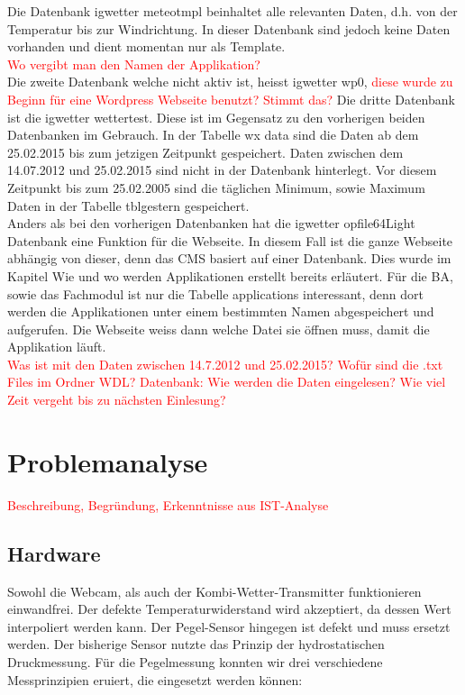 \documentclass[a4paper,ngerman, 11pt]{report}
\newcommand\Diskussionspunkt[1]{\textcolor{red}{#1}}
\begin{document}
Die Datenbank igwetter meteotmpl beinhaltet alle relevanten Daten, d.h. von der Temperatur bis zur Windrichtung. In dieser Datenbank sind jedoch keine Daten vorhanden und dient momentan nur als Template.\\

\Diskussionspunkt{Wo vergibt man den Namen der Applikation?}\\
Die zweite Datenbank welche nicht aktiv ist, heisst igwetter wp0, \Diskussionspunkt{diese wurde zu Beginn für eine Wordpress Webseite benutzt? Stimmt das?} Die dritte Datenbank ist die igwetter wettertest. Diese ist im Gegensatz zu den vorherigen beiden Datenbanken im Gebrauch. In der Tabelle wx data sind die Daten ab dem 25.02.2015 bis zum jetzigen Zeitpunkt gespeichert. Daten zwischen dem 14.07.2012 und 25.02.2015 sind nicht in der Datenbank hinterlegt. Vor diesem Zeitpunkt bis zum 25.02.2005 sind die täglichen Minimum, sowie Maximum Daten in der Tabelle tblgestern gespeichert.\\
Anders als bei den vorherigen Datenbanken hat die igwetter opfile64Light Datenbank eine Funktion für die Webseite. In diesem Fall ist die ganze Webseite abhängig von dieser, denn das CMS basiert auf einer Datenbank. Dies wurde im Kapitel Wie und wo werden Applikationen erstellt bereits erläutert. Für die BA, sowie das Fachmodul ist nur die Tabelle applications interessant, denn dort werden die Applikationen unter einem bestimmten Namen abgespeichert und aufgerufen. Die Webseite weiss dann welche Datei sie öffnen muss, damit die Applikation läuft.\\
\Diskussionspunkt{Was ist mit den Daten zwischen 14.7.2012 und 25.02.2015?}
\Diskussionspunkt{Wofür sind die .txt Files im Ordner WDL?}
\Diskussionspunkt{Datenbank: Wie werden die Daten eingelesen? Wie viel Zeit vergeht bis zu nächsten Einlesung?}
  

\section{Problemanalyse}
\Diskussionspunkt{Beschreibung, 
Begründung, 
Erkenntnisse aus IST-Analyse}

\subsection{Hardware}
Sowohl die Webcam, als auch der Kombi-Wetter-Transmitter funktionieren einwandfrei. Der defekte Temperaturwiderstand wird akzeptiert, da dessen Wert interpoliert werden kann. Der Pegel-Sensor hingegen ist defekt und muss ersetzt werden. Der bisherige Sensor nutzte das Prinzip der hydrostatischen Druckmessung. Für die Pegelmessung konnten wir drei verschiedene Messprinzipien eruiert, die eingesetzt werden können:
\end{document}
